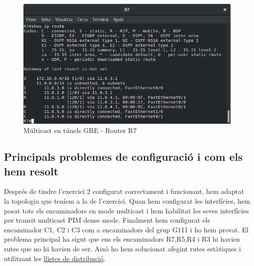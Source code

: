 \documentclass[10pt]{article}
\begin{document}
\begin{figure}[H]
\begin{center}
\includegraphics[scale=0.4]{Images/R7.png}
\caption{Múlticast en túnels GRE - Router R7}
\end{center}
\end{figure}
\subsection{Principals problemes de configuració i com els hem resolt}
Després de tindre l'exercici 2 configurat correctament i funcionant, hem adaptat la topologia que teníem a la de l'exercici. Quan hem configurat les interfícies, hem posat tots els encaminadors en mode multicast i hem habilitat les seves interfícies per transit multicast PIM dense mode. Finalment hem configurat els encaminador C1, C2 i C3 com a encaminadors del grup G111 i ho hem provat. El problema principal ha sigut que ens els encaminadors R7,R5,R4 i R3 hi havien rutes que no hi havien de ser. Això ho hem solucionat afegint rutes estàtiques i utilitzant les \href{http://www.ciscopress.com/articles/article.asp?p=2273507&seqNum=10}{llistes de distribució}.
\end{document}
